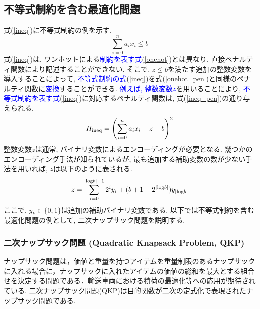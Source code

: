 \documentclass[submit,techrep,noauthor]{ipsj}
\begin{document}
\subsection{不等式制約を含む最適化問題}
式(\ref{ineq})に不等式制約の例を示す.
\begin{equation}
\sum_{i=0}^{n}a_{i}x_{i}\le b \label{ineq}
\end{equation}
式(\ref{ineq})は, ワンホットによる\textcolor{blue}{制約を表す式}(\ref{onehot})とは異なり, 直接ペナルティ関数により記述することができない. そこで, $z\le b$を満たす追加の整数変数を導入することによって, \textcolor{blue}{不等式制約の式}(\ref{ineq})を式(\ref{onehot_pen})と同様のペナルティ関数に\textcolor{blue}{変換}することができる. \textcolor{blue}{例えば, 整数変数$z$}を用いることにより, \textcolor{blue}{不等式制約を表す式}(\ref{ineq})に対応するペナルティ関数は, 式(\ref{ineq_pen})の通り与えられる.
\begin{equation}
H_{\rm{ineq}} = \left(\sum_{i=0}^{n}a_{i}x_{i}+z-b\right)^{2} \label{ineq_pen}
\end{equation}
整数変数$z$は通常, バイナリ変数によるエンコーディングが必要となる. 幾つかのエンコーディング手法が知られているが, 最も追加する補助変数の数が少ない手法を用いれば, $z$は以下のように表される.
\begin{equation}
z = \sum_{i=0}^{|{\rm{log}}b|-1}2^{i}y_{i}+(b+1-2^{|{\rm{log}}b|})y_{|{\rm{log}}b|}
\end{equation}
ここで, $y_{k}\in \{0, 1\}$は追加の補助バイナリ変数である. 以下では不等式制約を含む最適化問題の例として, 二次ナップサック問題を説明する.

\subsubsection{二次ナップサック問題 (Quadratic Knapsack Problem, QKP)}
ナップサック問題は，価値と重量を持つアイテムを重量制限のあるナップサックに入れる場合に，ナップサックに入れたアイテムの価値の総和を最大とする組合せを決定する問題である．輸送車両における積荷の最適化等への応用が期待されている. 二次ナップサック問題(QKP)は目的関数が二次の定式化で表現されたナップサック問題である. 

\end{document}
